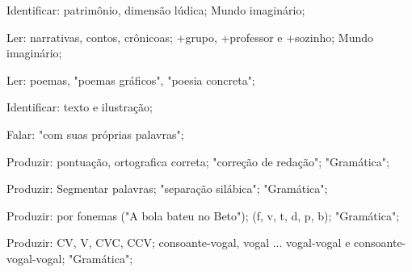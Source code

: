  Identificar: patrimônio, dimensão lúdica; Mundo imaginário;

 Ler: narrativas, contos, crônicoas; +grupo, +professor e +sozinho; Mundo imaginário;	

 Ler: poemas, "poemas gráficos", "poesia concreta";

 Identificar: texto e ilustração;

 Falar: "com suas próprias palavras";

 Produzir: pontuação, ortografica correta; "correção de redação"; "Gramática";

 Produzir: Segmentar palavras; "separação silábica"; "Gramática";

 Produzir: por fonemas ("A bola bateu no Beto"); (f, v, t, d, p, b); "Gramática";

 Produzir: CV, V, CVC, CCV; consoante-vogal, vogal ... vogal-vogal e consoante-vogal-vogal; "Gramática";


